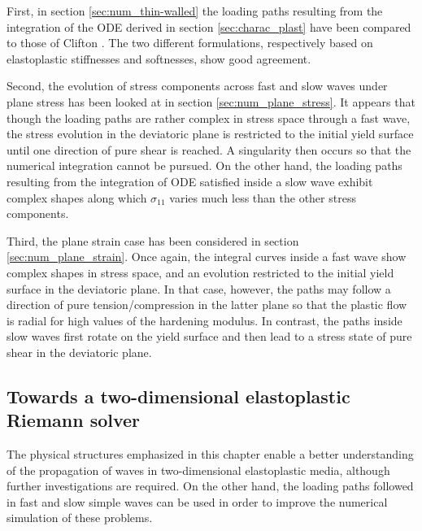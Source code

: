 First, in section \ref{sec:num_thin-walled} the loading paths resulting from the integration of the ODE derived in section \ref{sec:charac_plast} have been compared to those of Clifton \cite{Clifton}.
The two different formulations, respectively based on elastoplastic stiffnesses and softnesses, show  good agreement.

Second, the evolution of stress components across fast and slow waves under plane stress has been looked at in section \ref{sec:num_plane_stress}.
It appears that though the loading paths are rather complex in stress space through a fast wave, the stress evolution in the deviatoric plane is restricted to the initial yield surface until one direction of pure shear is reached.
A singularity then occurs so that the numerical integration cannot be pursued.
On the other hand, the loading paths resulting from the integration of ODE satisfied inside a slow wave exhibit complex shapes along which $\sigma_{11}$ varies much less than the other stress components.

Third, the plane strain case has been considered in section \ref{sec:num_plane_strain}.
Once again, the integral curves inside a fast wave show complex shapes in stress space, and an evolution restricted to the initial yield surface in the deviatoric plane.
In that case, however, the paths may follow a direction of pure tension/compression in the latter plane so that the plastic flow is radial for high values of the hardening modulus. 
In contrast, the paths inside slow waves first rotate on the yield surface and then lead to a stress state of pure shear in the deviatoric plane.

\subsection{Towards a two-dimensional elastoplastic Riemann solver}
The physical structures emphasized in this chapter enable a better understanding of the propagation of waves in two-dimensional elastoplastic media, although further investigations are required.
On the other hand, the loading paths followed in fast and slow simple waves can be used in order to improve the numerical simulation of these problems.

